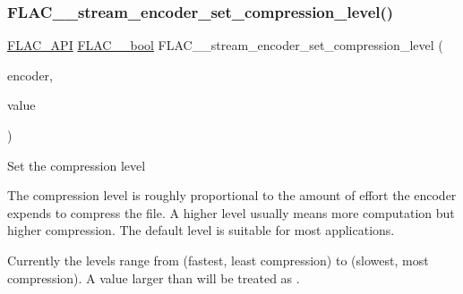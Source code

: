 \subsubsection{\texorpdfstring{FLAC\_\_stream\_encoder\_set\_compression\_level()}{FLAC\_\_stream\_encoder\_set\_compression\_level()}}
{\footnotesize\ttfamily \mbox{\hyperlink{group__flac__export_ga56ca07df8a23310707732b1c0007d6f5}{F\+L\+A\+C\+\_\+\+A\+PI}} \mbox{\hyperlink{ordinals_8h_a95103469f1cbd78b8cf250194985b34e}{F\+L\+A\+C\+\_\+\+\_\+bool}} F\+L\+A\+C\+\_\+\+\_\+stream\+\_\+encoder\+\_\+set\+\_\+compression\+\_\+level (\begin{DoxyParamCaption}\item[{\mbox{\hyperlink{struct_f_l_a_c_____stream_encoder}{F\+L\+A\+C\+\_\+\+\_\+\+Stream\+Encoder}} $\ast$}]{encoder,  }\item[{unsigned}]{value }\end{DoxyParamCaption})}

Set the compression level

The compression level is roughly proportional to the amount of effort the encoder expends to compress the file. A higher level usually means more computation but higher compression. The default level is suitable for most applications.

Currently the levels range from {} (fastest, least compression) to {} (slowest, most compression). A value larger than {} will be treated as {}.

